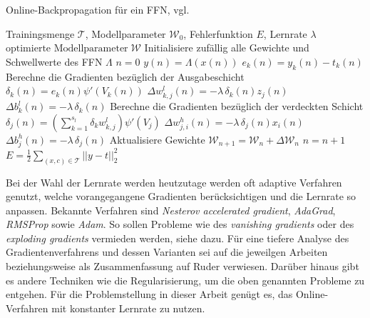 \begin{algorithm}
    \caption{Online-Backpropagation für ein FFN, vgl. \cite{du_diss}}
    \label{alg:online_backprop}
    \begin{algorithmic}
    \Require  Trainingsmenge $\mathcal{T}$, Modellparameter $\mathcal{W}_0$, Fehlerfunktion $E$, Lernrate $\lambda$ 
    \Ensure $\text{optimierte Modellparameter} \; \mathcal{W}$
    \State Initialisiere zufällig alle Gewichte und Schwellwerte des FFN $\Lambda$ 
    \State $n=0$  
     
        \State $y(n)=\Lambda(x(n))$
        \State $e_k(n)=y_k(n)-t_k(n)$
        \State Berechne die Gradienten bezüglich der Ausgabeschicht
        \State $\delta_k(n)= e_k(n) \psi'(V_k(n))$
        \State $\Delta w_{k,j}^l(n)= -\lambda \, \delta_k(n) z_j(n)$
        \State $\Delta b_{k}^l(n)= -\lambda \, \delta_k(n)$
        \State Berechne die Gradienten bezüglich der verdeckten Schicht
        \State $\delta_j(n)= \left(\sum_{k=1}^{s_l} \delta_k w_{k,j}^l\right) \psi'(V_j)$
        \State $\Delta w_{j,i}^h(n)= -\lambda \, \delta_j(n) x_i(n)$
        \State $\Delta b_{j}^h(n)= -\lambda \, \delta_j(n)$
        \State Aktualisiere Gewichte 
        \State $\mathcal{W}_{n+1}= \mathcal{W}_n + \Delta \mathcal{W}_n$
        \State $n=n+1$
    \EndFor
    \State $E=\frac{1}{2} \sum_{(x,c) \in \mathcal{T}} ||y-t||_2^2$
    \EndWhile
    \end{algorithmic}
\end{algorithm}


Bei der Wahl der Lernrate werden heutzutage werden oft adaptive Verfahren genutzt, welche vorangegangene Gradienten berücksichtigen und die Lernrate so anpassen. Bekannte Verfahren sind \textit{Nesterov accelerated
gradient}\cite{sutskever2013importance}, \textit{AdaGrad}\cite{duchi2011adaptive}, \textit{RMSProp}\cite{tieleman2012lecture} sowie \textit{Adam}\cite{Kingma2015AdamAM}. So sollen Probleme wie des \textit{vanishing gradients} oder des \textit{exploding gradients} vermieden werden, siehe dazu\cite{hanin2018neural}.
Für eine tiefere Analyse des Gradientenverfahrens und dessen Varianten sei auf die jeweilgen Arbeiten beziehungsweise als Zusammenfassung auf Ruder\cite{ruder2016overview,} verwiesen. Darüber hinaus gibt es andere Techniken wie die Regularisierung, um die oben genannten Probleme zu entgehen.
Für die Problemstellung in dieser Arbeit genügt es, das Online-Verfahren mit konstanter Lernrate zu nutzen. 



